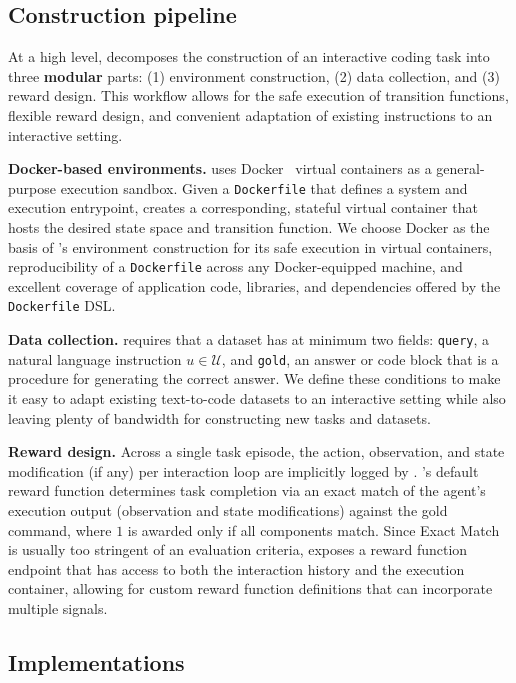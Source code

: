 \subsection{Construction pipeline}
\label{sec:benchmark:construct_pipeline}
At a high level, \benchmark{} decomposes the construction of an interactive coding task into three \textbf{modular} parts: (1) environment construction, (2) data collection, and (3) reward design.
This workflow allows for the safe execution of transition functions, flexible reward design, and convenient adaptation of existing instructions to an interactive setting.

\textbf{Docker-based environments.}
\benchmark{} uses Docker~\cite{merkel2014docker} virtual containers as a general-purpose execution sandbox.
Given a \texttt{Dockerfile} that defines a system and execution entrypoint, \benchmark{} creates a corresponding, stateful virtual container that hosts the desired state space and transition function.
We choose Docker as the basis of \benchmark{}'s environment construction for its safe execution in virtual containers, reproducibility of a \texttt{Dockerfile} across any Docker-equipped machine, and excellent coverage of application code, libraries, and dependencies offered by the \texttt{Dockerfile} DSL.

\textbf{Data collection.}
\benchmark{} requires that a dataset has at minimum two fields: \texttt{query}, a natural language instruction $u \in \mathcal{U}$, and \texttt{gold}, an answer or code block that is a procedure for generating the correct answer.
We define these conditions to make it easy to adapt existing text-to-code datasets to an interactive setting while also leaving plenty of bandwidth for constructing new tasks and datasets.

\textbf{Reward design.}
Across a single task episode, the action, observation, and state modification (if any) per interaction loop are implicitly logged by \benchmark{}.
\benchmark{}'s default reward function determines task completion via an exact match of the agent's execution output (observation and state modifications) against the gold command, where $1$ is awarded only if all components match.
Since Exact Match is usually too stringent of an evaluation criteria, \benchmark{} exposes a reward function endpoint that has access to both the interaction history and the execution container, allowing for custom reward function definitions that can incorporate multiple signals.

\subsection{Implementations}
\label{sec:benchmark:ic_envs}

